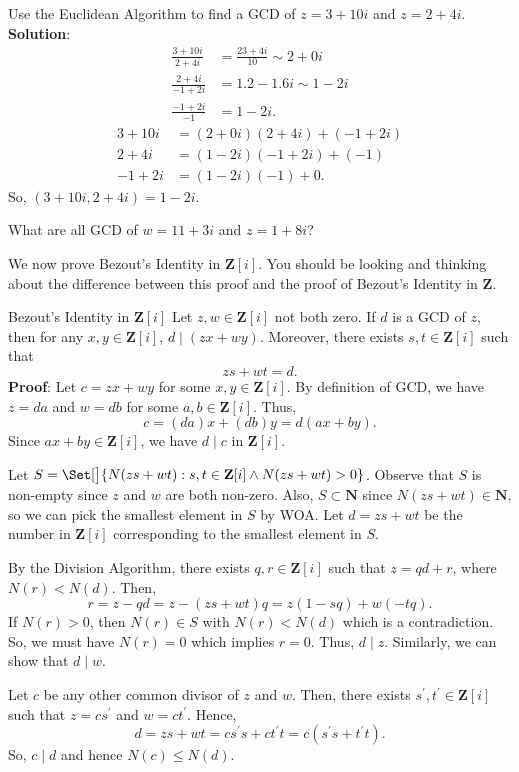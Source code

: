 \begin{Exercise}{}{}
    Use the Euclidean Algorithm to find a GCD of $ z=3+10i $ and $ z=2+4i $.
    \tcblower{}
    \textbf{Solution}:
    \begin{align*}
        \frac{3+10i}{2+4i} & =\frac{23+4i}{10}\sim 2+0i \\
        \frac{2+4i}{-1+2i} & =1.2-1.6i\sim 1-2i         \\
        \frac{-1+2i}{-1}   & =1-2i.
    \end{align*}
    \begin{align*}
        3+10i & =(2+0i)(2+4i)+(-1+2i) \\
        2+4i  & =(1-2i)(-1+2i)+(-1)   \\
        -1+2i & =(1-2i)(-1)+0.
    \end{align*}
    So, $ (3+10i,2+4i)=1-2i $.
\end{Exercise}
\begin{Exercise}{}{}
    What are all GCD of $ w=11+3i $ and $ z=1+8i $?
\end{Exercise}
We now prove Bezout's Identity in $ \mathbf{Z}[i] $. You should be looking and thinking
about the difference between this proof and the proof of Bezout's Identity in $ \mathbf{Z} $.
\begin{Theorem}{Bezout's Identity in $ \mathbf{Z}[i] $}{}
    Let $ z,w\in\mathbf{Z}[i] $ not both zero. If $ d $ is a GCD of $ z $,
    then for any $ x,y\in\mathbf{Z}[i] $, $ d\mid (zx+wy) $. Moreover, there exists
    $ s,t\in\mathbf{Z}[i] $ such that
    \[ zs+wt=d. \]
    \tcblower{}
    \textbf{Proof}: Let $ c=zx+wy $ for some $ x,y\in\mathbf{Z}[i] $. By definition of GCD, we have
    $ z=da $ and $ w=db $ for some $ a,b\in\mathbf{Z}[i] $. Thus,
    \[ c=(da)x+(db)y=d(ax+by). \]
    Since $ ax+by\in\mathbf{Z}[i] $, we have $ d\mid c $ in $ \mathbf{Z}[i] $.

    Let $ S=\Set[\big]{N(zs+wt)\given s,t\in\mathbf{Z}[i]\land N(zs+wt)>0} $. Observe that $ S $
    is non-empty since $ z $ and $ w $ are both non-zero. Also, $ S\subset \mathbf{N} $ since $ N(zs+wt)\in\mathbf{N} $,
    so we can pick the smallest element in $ S $ by WOA\@. Let $ d=zs+wt $ be the number in $ \mathbf{Z}[i] $
    corresponding to the smallest element in $S$.

    By the Division Algorithm, there exists $ q,r\in\mathbf{Z}[i] $ such that $ z=qd+r $, where $ N(r)<N(d) $. Then,
    \[ r=z-qd=z-(zs+wt)q=z(1-sq)+w(-tq). \]
    If $ N(r)>0 $, then $ N(r)\in S $ with $ N(r)<N(d) $ which is a contradiction. So, we
    must have $ N(r)=0 $ which implies $ r=0 $. Thus, $ d\mid z $. Similarly, we can show that $ d\mid w $.

    Let $c$ be any other common divisor of $ z $ and $ w $. Then, there exists $ s^\prime, t^\prime\in\mathbf{Z}[i] $
    such that $ z=cs^\prime $ and $ w=ct^\prime $. Hence,
    \[ d=zs+wt=cs^\prime s+ct^\prime t=c(s^\prime s+t^\prime t). \]
    So, $c \mid d$ and hence $N (c)\le N (d)$.
\end{Theorem}
